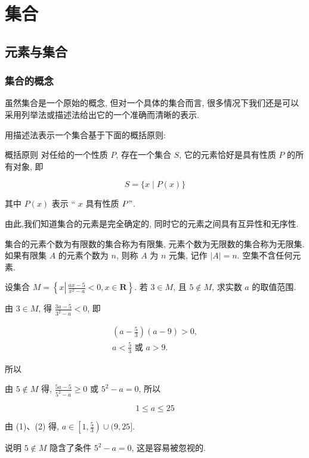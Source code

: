\chapter{集合}
\section{元素与集合}
\subsection{集合的概念}
虽然集合是一个原始的概念, 但对一个具体的集合而言, 很多情况下我们还是可以采用列举法或描述法给出它的一个准确而清晰的表示.

用描述法表示一个集合基于下面的概括原则:

概括原则 对任给的一个性质 $P$, 存在一个集合 $S$, 它的元素恰好是具有性质 $P$ 的所有对象, 即

$$
	S=\{x \mid P(x)\}
$$

其中 $P(x)$ 表示 “ $x$ 具有性质 $P "$.

由此,我们知道集合的元素是完全确定的, 同时它的元素之间具有互异性和无序性.

集合的元素个数为有限数的集合称为有限集, 元素个数为无限数的集合称为无限集. 如果有限集 $A$ 的元素个数为 $n$, 则称 $A$ 为 $n$ 元集, 记作 $|A|=n$. 空集不含任何元素.

\begin{example}
	设集合 $M=\left\{x \left\lvert\, \frac{a x-5}{x^{2}-a}<0\right., x \in \mathbf{R}\right\}$. 若 $3 \in M$, 且 $5 \notin M$, 求实数 $a$ 的取值范围.
\end{example}
\begin{solution}
	由 $3 \in M$, 得 $\frac{3 a-5}{3^{2}-a}<0$, 即

	\begin{gather*}
		\left(a-\frac{5}{3}\right)(a-9)>0, \\
		a<\frac{5}{3} \text { 或 } a>9 . \tag{1}
	\end{gather*}


	所以

	由 $5 \notin M$ 得, $\frac{5 a-5}{5^{2}-a} \geqslant 0$ 或 $5^{2}-a=0$, 所以

	\begin{equation*}
		1 \leqslant a \leqslant 25 \tag{2}
	\end{equation*}


	由 (1)、(2) 得, $a \in\left[1, \frac{5}{3}\right) \cup(9,25]$.

	说明 $5 \notin M$ 隐含了条件 $5^{2}-a=0$, 这是容易被忽视的.
\end{solution}

